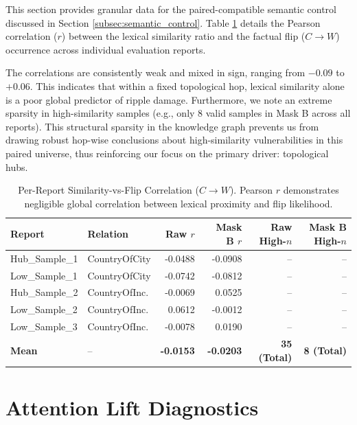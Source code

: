 This section provides granular data for the paired-compatible semantic control discussed in Section \ref{subsec:semantic_control}. Table \ref{tab:semantic_corr} details the Pearson correlation ($r$) between the lexical similarity ratio and the factual flip ($C \rightarrow W$) occurrence across individual evaluation reports. 

The correlations are consistently weak and mixed in sign, ranging from $-0.09$ to $+0.06$. This indicates that within a fixed topological hop, lexical similarity alone is a poor global predictor of ripple damage. Furthermore, we note an extreme sparsity in high-similarity samples (e.g., only 8 valid samples in Mask B across all reports). This structural sparsity in the knowledge graph prevents us from drawing robust hop-wise conclusions about high-similarity vulnerabilities in this paired universe, thus reinforcing our focus on the primary driver: topological hubs.

\begin{table}[htbp]
\centering
\small
\begin{tabular}{llrrrr}
\toprule
\textbf{Report} & \textbf{Relation} & \textbf{Raw $r$} & \textbf{Mask B $r$} & \textbf{Raw High-$n$} & \textbf{Mask B High-$n$} \\
\midrule
Hub\_Sample\_1 & CountryOfCity & -0.0488 & -0.0908 & -- & -- \\
Low\_Sample\_1  & CountryOfCity & -0.0742 & -0.0812 & -- & -- \\
Hub\_Sample\_2& CountryOfInc. & -0.0069 &  0.0525 & -- & -- \\
Low\_Sample\_2 & CountryOfInc. &  0.0612 & -0.0012 & -- & -- \\
Low\_Sample\_3 & CountryOfInc. & -0.0078 &  0.0190 & -- & -- \\
\midrule
\textbf{Mean} & -- & \textbf{-0.0153} & \textbf{-0.0203} & \textbf{35 (Total)} & \textbf{8 (Total)} \\
\bottomrule
\end{tabular}
\caption{Per-Report Similarity-vs-Flip Correlation ($C \rightarrow W$). Pearson $r$ demonstrates negligible global correlation between lexical proximity and flip likelihood.}
\label{tab:semantic_corr}
\end{table} %
\section{Attention Lift Diagnostics}
\label{app:attention_diagnostics}

